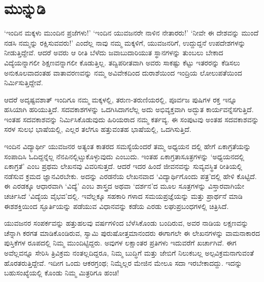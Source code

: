
\chapter*{ಮುನ್ನುಡಿ}

‘ಇಂದಿನ ಮಕ್ಕಳು ಮುಂದಿನ ಪ್ರಜೆಗಳು!’ ‘ಇಂದಿನ ಯುವಜನರೇ ನಾಳಿನ ನೇತಾರರು!’ ‘ನೀವೇ ಈ ದೇಶವನ್ನು ಮುಂದೆ ನಡಸಿ ನಮ್ಮನ್ನು ರಕ್ಷಿಸುವವರು!’ ಎಂದೆಲ್ಲ ನಾವು ನಮ್ಮ ಮಕ್ಕಳಿಗೆ, ಯುವಜನರಿಗೆ, ಉದ್ದುದ್ದನೆ ಉಪದೇಶಗಳನ್ನು ನೀಡುತ್ತಿದ್ದೇವೆ. ಆದರೆ ಅವರು ಆ ರೀತಿ ಬೆಳೆದು ಜವಾಬುದಾರಿಯುತ ಸ್ಥಾನಗಳನ್ನು ತುಂಬಲು ಬೇಕಾದ ವಿದ್ಯೆಯನ್ನಾಗಲೀ ಶಿಕ್ಷಣವನ್ನಾಗಲೀ ಕೊಡುತ್ತಿಲ್ಲ. ತದ್ವಿಪರೀತವಾಗಿ ಅವರು ಸಾಕಷ್ಟು ಕೆಟ್ಟು ಇತರರನ್ನು ಕೆಡಿಸಲು ಅನುಕೂಲವಾದಂತಹ ವಾತಾವರಣವನ್ನು ನಮ್ಮ ಅವಿವೇಕದಿಂದ ದುರಾಶೆಯಿಂದ ಇಂದ್ರಿಯ ಲೋಲುಪತೆಯಿಂದ ನಿರ್ಮಿಸುತ್ತಿದ್ದೇವೆ.

ಆದರೆ ಅದೃಷ್ಟವಶಾತ್ ಇಂದಿಗೂ ನಮ್ಮ ಮಕ್ಕಳಲ್ಲಿ, ತರುಣ-ತರುಣಿಯರಲ್ಲಿ, ಪೂರ್ವಜ ಪುಷಿಗಳ ರಕ್ತ ಇನ್ನೂ ಹಸಿಯಾಗಿ ಹರಿಯುತ್ತಿದೆ. ಸದವಕಾಶಗಳನ್ನು ಒದಗಿಸಿದಾಗಲೆಲ್ಲ ಅದು ಅಭಿವ್ಯಕ್ತವಾಗಿ ಅದ್ಭುತ ಕಾರ್ಯವನ್ನೆಸಗುತ್ತಿದೆ. ಇಂತಹ ಸದವಕಾಶವನ್ನು ನಿರ್ಮಿಸಿಕೊಡುವುದು ಹಿರಿಯರಾದ ನಮ್ಮ ಕರ್ತವ್ಯ. ಈ ಸಂಪುಟವು ಅಂತಹ ಸದವಕಾಶವನ್ನು ಸರಳ ಸುಲಭ ಭಾಷೆಯಲ್ಲಿ, ಎಲ್ಲರ ತಲೆಗೂ ಹತ್ತುವಂತಹ ಭಾಷೆಯಲ್ಲಿ, ಒದಗಿಸುತ್ತಿದೆ.

ಇಂದಿನ ವಿದ್ಯಾರ್ಥೀ ಯುವಜನರ ಅತ್ಯಂತ ಕಾತರದ ಸಮಸ್ಯೆಯೆಂದರೆ ತಮ್ಮ ಅಧ್ಯಯನ ದಲ್ಲಿ ಹೇಗೆ ಏಕಾಗ್ರತೆಯನ್ನು ಸಂಪಾದಿಸಿ ಓದಿದ್ದನ್ನೆಲ್ಲ ನೆನಪಿನಲ್ಲಿಟ್ಚುಕೊಳ್ಳುವುದು ಎಂಬುದು. ಇಂತಹ ಏಕಾಗ್ರತಾಸೂತ್ರಗಳನ್ನು ‘ಅಧ್ಯಯನದಲ್ಲಿ ಏಕಾಗ್ರತೆ’ ಎಂಬ ಪ್ರಥಮ ಲೇಖನವು ವಿವರಿಸುತ್ತದೆ. ಆದರೆ ಇದರ ಹಿಂದೆ ಜೀವನವನ್ನು ಸುವ್ಯವಸ್ಥಿತ ರೀತಿಯಲ್ಲಿ ನಡೆಸುವ ಕ್ರಮದ ಜ್ಞಾನವಿರಬೇಕು. ಅದನ್ನು ಎರಡನೆಯ ಲೇಖನವಾದ ‘ವಿದ್ಯಾರ್ಥಿಗೊಂದು ಪತ್ರ’ದಲ್ಲಿ ಹೇಳಿ ಕೊಟ್ಟಿದೆ. ಈ ಎರಡಕ್ಕೂ ಆಧಾರವಾಗಿ ‘ವಿದ್ಯೆ’ ಎಂಬ ಶಾಸ್ತ್ರದ ಅಥವಾ ‘ದರ್ಶನ’ದ ಮೂಲ ಸೂತ್ರಗಳನ್ನು ವಿಸ್ತಾರವಾಗಿಯೇ ಚರ್ಚಿಸಿದೆ ‘ವಿದ್ಯೆಯ ವೈಭವ’ದಲ್ಲಿ. ಇವೆಲ್ಲಕ್ಕೂ ಸಹಕಾರಿ ಗಳಾದ ಸಮಯಪ್ರಜ್ಞೆಯನ್ನು ಮತ್ತು ಪ್ರಾರ್ಥನೆ ಮಾಡಿ ಈಶಶಕ್ತಿಯಿಂದ ಸ್ಫೂರ್ತಿಯನ್ನು ಪಡೆಯುವ ವಿಧಾನವನ್ನು ಕಡೆಯ ಎರಡು ಲಘುಪ್ರಬಂಧಗಳಲ್ಲಿ ಚಿತ್ರಿಸಿದೆ.

ಯುವಜನರ ಸಂಪರ್ಕವನ್ನು ಹತ್ತುಹಲವು ವರ್ಷಗಳಿಂದ ಬೆಳೆಸಿಕೊಂಡು ಬಂದಿರುವ, ಅವರ ನಾಡಿಯ ಲಕ್ಷಣವನ್ನು ಚೆನ್ನಾಗಿ ಕರಗತ ಮಾಡಿಕೊಂಡಿರುವ, ಸ್ವಾಮಿ ಪುರುಷೋತ್ತಮಾನಂದರು ಈಗಾಗಲೇ ಈ ಲೇಖನಗಳನ್ನು ವಾಮನಾಕಾರದ ಪುಸ್ತಿಕೆಗಳ ರೂಪದಲ್ಲಿ ನಿಮ್ಮ ಮುಂದಿಟ್ಟಿದ್ದರು. ಅವುಗಳ ಲಕ್ಷಾಂತರ ಪ್ರತಿಗಳು ಇದುವರೆಗೆ ಖರ್ಚಾಗಿವೆ. ಈಗ ಅವೆಲ್ಲವನ್ನೂ ಸೇರಿಸಿ ತ್ರಿವಿಕ್ರಮ ನಂತಲ್ಲದಿದ್ದರೂ, ನಿಮ್ಮ ಬುದ್ಧಿಗೆ ಮತ್ತು ಜೇಬಿಗೆ ನಿಲುಕಬಲ್ಲ ಅಲ್ಪವಿಕ್ರಮನಾಗುವಂತೆ ಹೊರತರುತ್ತಿದ್ದೇವೆ. ಇದೀಗ ಒಂದು ಆಕರಗ್ರಂಥ; ನಿಮ್ಮೆಲ್ಲರ ಮೇಜಿನ ಮೇಲೂ ಸದಾ ಇರಬೇಕಾದದ್ದು. ಇದನ್ನು ಬಹುಸಂಖ್ಯೆಯಲ್ಲಿ ಕೊಂಡು ನಿಮ್ಮ ಮಿತ್ರರಿಗೂ ಹಂಚಿ!


